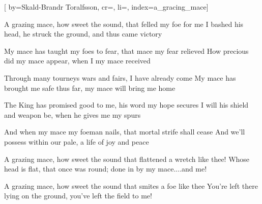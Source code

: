 

[%
    by={Skald-Brandr Toralfsson},
    cr={},
    li={},
    index={a_gracing_mace}]


    \label{a_gracing_mace}

    \beginverse\memorize[verse]
        A grazing mace, how sweet the sound, that felled my foe for me
        I bashed his head, he struck the ground, and thus came victory
    \endverse

    \beginverse\memorize[verse]
        My mace has taught my foes to fear, that mace my fear relieved
        How precious did my mace appear, when I my mace received
    \endverse

    \beginverse\memorize[verse]
        Through many tourneys wars and fairs, I have already come
        My mace has brought me safe thus far, my mace will bring me home
    \endverse

    \beginverse\memorize[verse]
        The King has promised good to me, his word my hope secures
        I will his shield and weapon be, when he gives me my spurs
    \endverse

    \beginverse\memorize[verse]
        And when my mace my foeman nails, that mortal strife shall cease
        And we'll possess within our pale, a life of joy and peace
    \endverse

    \beginverse\memorize[verse]
        A grazing mace, how sweet the sound that flattened a wretch like thee!
        Whose head is flat, that once was round; done in by my mace....and me!
    \endverse

    \beginverse\memorize[verse]
        A grazing mace, how sweet the sound that smites a foe like thee
        You're left there lying on the ground, you've left the field to me!
    \endverse
\endsong
